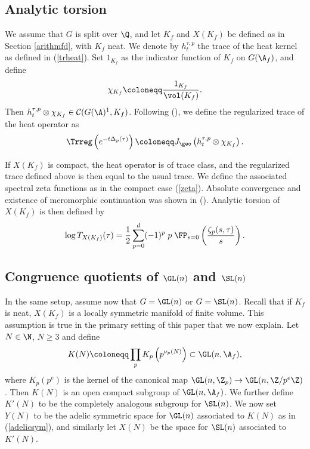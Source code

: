 \subsection{Analytic torsion} We assume that $G$ is split over $\Q$, and let $K_f$ and $X(K_f)$ be defined as in Section \ref{arithmfd}, with $K_f$ neat. We denote by $h_t^{\tau,p}$ the trace of the heat kernel as defined in (\ref{trheat}). Set $1_{K_f}$ as the indicator function of $K_f$ on $G(\A_f)$, and define
\begin{align*}
    \chi_{K_f}\coloneqq\frac{1_{K_f}}{\vol(K_f)}.
\end{align*} Then $h_t^{\tau,p}\otimes \chi_{K_f}\in \mathcal{C}(G(\A)^1,K_f)$. Following (\cite{MzM1}), we define the regularized trace of the heat operator as
\begin{align*}
    \Trreg\left(e^{-t\Delta_p(\tau)}\right)\coloneqq J_{\geo}\left(h_t^{\tau,p}\otimes \chi_{K_f}\right).
\end{align*}

If $X(K_f)$ is compact, the heat operator is of trace class, and the regularized trace defined above is then equal to the usual trace. We define the associated spectral zeta functions as in the compact case (\ref{zeta}). Absolute convergence and existence of meromorphic continuation was shown in (\cite{MzM1}). Analytic torsion of $X(K_f)$ is then defined by
\begin{align}\label{torsion}
    \log T_{X(K_f)}(\tau) = \frac12\sum_{p=0}^d(-1)^p\;p\; \FP_{s=0}\left(\frac{\zeta_p(s,\tau)}{s}\right).
\end{align}

\subsection{Congruence quotients of $\GL(n)$ and $\SL(n)$}\label{congquot}

In the same setup, assume now that $G=\GL(n)$ or $G=\SL(n)$. Recall that if $K_f$ is neat, $X(K_f)$ is a locally symmetric manifold of finite volume. This assumption is true in the primary setting of this paper that we now explain. Let $N\in\N$, $N\geq 3$ and define 
\begin{align*}
    K(N)\coloneqq\prod_p K_p\left(p^{\nu_p(N)}\right) \subset \GL(n,\A_f),
\end{align*}
where $K_p(p^e)$ is the kernel of the canonical map $\GL(n,\Z_p)\to \GL(n,\Z/p^e\Z)$. Then $K(N)$ is an open compact subgroup of $\GL(n,\A_f)$. We further define $K'(N)$ to be the completely analogous subgroup for $\SL(n)$. We now set $Y(N)$ to be the adelic symmetric space for $\GL(n)$ associated to $K(N)$ as in (\ref{adelicsym}), and similarly let $X(N)$ be the space for $\SL(n)$ associated to $K'(N)$.

